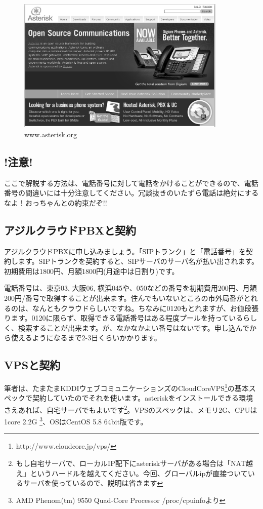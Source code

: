 \begin{figure}[htbp]
 \begin{center}
  \includegraphics[width=100mm]{tboffice-asterisk/img/asterisk-site.eps}
 \end{center}
 \caption{www.asterisk.org}
 \label{fig:gaiyou}
\end{figure}


\subsection{\textbf{!注意!}}
ここで解説する方法は、電話番号に対して電話をかけることができるので、電話番号の間違いには十分注意してください。冗談抜きのいたずら電話は絶対にするなよ！おっちゃんとの約束だぞ!!

\subsection{アジルクラウドPBXと契約}
アジルクラウドPBXに申し込みましょう。「SIPトランク」と「電話番号」を契約します。SIPトランクを契約すると、SIPサーバのサーバ名が払い出されます。初期費用は1800円、月額1800円(月途中は日割り)です。

電話番号は、東京03, 大阪06, 横浜045や、050などの番号を初期費用200円、月額200円/番号で取得することが出来ます。住んでもいないところの市外局番がとれるのは、なんともクラウドらしいですね。ちなみに0120もとれますが、お値段張ります。0120に限らず、取得できる電話番号はある程度プールを持っているらしく、検索することが出来ます。が、なかなかよい番号はないです。申し込んでから使えるようになるまで2-3日くらいかかります。

\subsection{VPSと契約}
筆者は、たまたまKDDIウェブコミュニケーションズのCloudCoreVPS\footnote{http://www.cloudcore.jp/vps/}の基本スペックで契約していたのでそれを使います。asteriskをインストールできる環境さえあれば、自宅サーバでもよいです\footnote{もし自宅サーバで、ローカルIP配下にasteriskサーバがある場合は「NAT越え」というハードルを越えてください。今回、グローバルipが直接ついているサーバを使っているので、説明は省きます}。VPSのスペックは、メモリ2G、CPUは1core 2.2G \footnote{AMD Phenom(tm) 9550 Quad-Core Processor /proc/cpuinfoより}、OSはCentOS 5.8 64bit版です。


